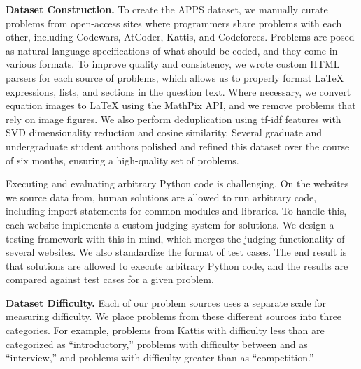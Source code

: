 \documentclass{article}
\begin{document}
\noindent\textbf{Dataset Construction.}\quad
To create the APPS dataset, we manually curate problems from open-access sites where programmers share problems with each other, including Codewars, AtCoder, Kattis, and Codeforces. Problems are posed as natural language specifications of what should be coded, and they come in various formats. To improve quality and consistency, we wrote custom HTML parsers for each source of problems, which allows us to properly format LaTeX expressions, lists, and sections in the question text. Where necessary, we convert equation images to LaTeX using the MathPix API, and we remove problems that rely on image figures. We also perform deduplication using tf-idf features with SVD dimensionality reduction and cosine similarity. Several graduate and undergraduate student authors polished and refined this dataset over the course of six months, ensuring a high-quality set of problems.

Executing and evaluating arbitrary Python code is challenging. On the websites we source data from, human solutions are allowed to run arbitrary code, including import statements for common modules and libraries. To handle this, each website implements a custom judging system for solutions. We design a testing framework with this in mind, which merges the judging functionality of several websites. We also standardize the format of test cases. The end result is that solutions are allowed to execute arbitrary Python code, and the results are compared against test cases for a given problem.



\noindent\textbf{Dataset Difficulty.}\quad
Each of our problem sources uses a separate scale for measuring difficulty. We place problems from these different sources into three categories. For example, problems from Kattis with difficulty less than  are categorized as ``introductory,'' problems with difficulty between  and  as ``interview,'' and problems with difficulty greater than  as ``competition.''
\end{document}
